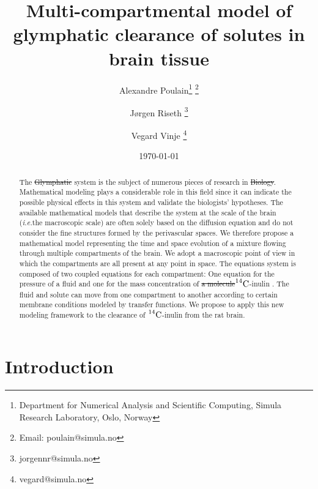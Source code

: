 \documentclass[10pt]{article}
\title{Multi-compartmental model of glymphatic clearance of solutes in brain tissue}
\author{Alexandre Poulain\thanks{Department for Numerical Analysis and Scientific Computing, Simula Research Laboratory, Oslo, Norway} 
\thanks{Email: poulain@simula.no} \and Jørgen Riseth \thanks{jorgennr@simula.no} \and Vegard Vinje \thanks{vegard@simula.no}}
\date{\today}
\newcommand{\VV}[1]{\textcolor{red}{VV: #1}}
\newcommand{\ie}{\emph{i.e.}\;}
\newcommand{\1}{^{(1)}}
\newcommand{\2}{^{(2)}}
\newcommand{\Cinulin}{$\prescript{14}{}{\text{C}}$-inulin }
\newcommand{\corr}[1]{\textcolor{blue}{#1}} %
\providecommand{\DIFaddtex}[1]{{\protect\color{blue}\uwave{#1}}} %
\providecommand{\DIFdeltex}[1]{{\protect\color{red}\sout{#1}}}                      %
\providecommand{\DIFaddbegin}{} %
\providecommand{\DIFaddend}{} %
\providecommand{\DIFdelbegin}{} %
\providecommand{\DIFdelend}{} %
\providecommand{\DIFadd}[1]{\texorpdfstring{\DIFaddtex{#1}}{#1}} %
\providecommand{\DIFdel}[1]{\texorpdfstring{\DIFdeltex{#1}}{}} %
\newcommand{\DIFscaledelfig}{0.5}
\newlength{\DIFdelgraphicswidth} %
\newlength{\DIFdelgraphicsheight} %
\newcommand{\DIFaddincludegraphics}[2][]{{\color{blue}\fbox{\DIFOincludegraphics[#1]{#2}}}} %
\newcommand{\DIFdelincludegraphics}[2][]{%
\sbox{\DIFdelgraphicsbox}{\DIFOincludegraphics[#1]{#2}}%
\settoboxwidth{\DIFdelgraphicswidth}{\DIFdelgraphicsbox} %
\settoboxtotalheight{\DIFdelgraphicsheight}{\DIFdelgraphicsbox} %
\scalebox{\DIFscaledelfig}{%
\parbox[b]{\DIFdelgraphicswidth}{\usebox{\DIFdelgraphicsbox}\\[-\baselineskip] \rule{\DIFdelgraphicswidth}{0em}}\llap{\resizebox{\DIFdelgraphicswidth}{\DIFdelgraphicsheight}{%
\setlength{\unitlength}{\DIFdelgraphicswidth}%
\begin{picture}(1,1)%
\thicklines\linethickness{2pt} %
{\color[rgb]{1,0,0}\put(0,0){\framebox(1,1){}}}%
{\color[rgb]{1,0,0}\put(0,0){\line( 1,1){1}}}%
{\color[rgb]{1,0,0}\put(0,1){\line(1,-1){1}}}%
\end{picture}%
}\hspace*{3pt}}} %
} %
\DeclareRobustCommand{\DIFaddbegin}{\DIFOaddbegin \let\includegraphics\DIFaddincludegraphics} %
\DeclareRobustCommand{\DIFaddend}{\DIFOaddend \let\includegraphics\DIFOincludegraphics} %
\DeclareRobustCommand{\DIFdelbegin}{\DIFOdelbegin \let\includegraphics\DIFdelincludegraphics} %
\DeclareRobustCommand{\DIFdelend}{\DIFOaddend \let\includegraphics\DIFOincludegraphics} %
\begin{document}
\maketitle


\begin{abstract}
    The \DIFdelbegin \DIFdel{Glymphatic }\DIFdelend \DIFaddbegin \DIFadd{\corr{glymphatic} }\DIFaddend system is the subject of numerous pieces of research in \DIFdelbegin \DIFdel{Biology}\DIFdelend \DIFaddbegin \DIFadd{\corr{biology}}\DIFaddend . Mathematical modeling plays a considerable role in this field since it can indicate the possible physical effects in this system and validate the biologists' hypotheses. The available mathematical models that describe the system at the scale of the brain (\ie the macroscopic scale) are often solely based on the diffusion equation and do not consider the fine structures formed by the perivascular spaces.   
 We therefore propose a mathematical model representing the time and space evolution of a mixture flowing through multiple compartments of the brain. We adopt a macroscopic point of view in which the compartments are all present at any point in space. The equations system is composed of two coupled equations for each compartment: One equation for the pressure of a fluid and one for the mass concentration of \DIFdelbegin \DIFdel{a molecule}\DIFdelend \DIFaddbegin \Cinulin\DIFaddend . The fluid and solute can move from one compartment to another according to certain membrane conditions modeled by transfer functions. We propose to apply this new modeling framework to the clearance of \Cinulin from the rat brain. 
\end{abstract}


\section{Introduction}

\end{document}
